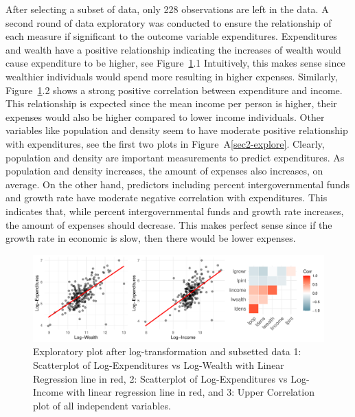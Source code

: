 \documentclass[11pt]{article}\usepackage[]{graphicx}\usepackage[]{color}
\makeatletter
\def\maxwidth{ %
  \ifdim\Gin@nat@width>\linewidth
    \linewidth
  \else
    \Gin@nat@width
  \fi
}
\makeatother
\begin{document}
\noindent After selecting a subset of data, only 228 observations are left in the data. A second round of data exploratory was conducted to ensure the relationship of each measure if significant to the outcome variable expenditures. Expenditures and wealth have a positive relationship indicating the increases of wealth would cause expenditure to be higher, see Figure~\ref{sec-explore}.1 Intuitively, this makes sense since wealthier individuals would spend more resulting in higher expenses. Similarly, Figure~\ref{sec-explore}.2 shows a strong positive correlation between expenditure and income. This relationship is expected since the mean income per person is higher, their expenses would also be higher compared to lower income individuals. Other variables like population and density seem to have moderate positive relationship with expenditures, see the first two plots in Figure~A\ref{sec2-explore}. Clearly, population and density are important measurements to predict expenditures. As population and density increases, the amount of expenses also increases, on average. On the other hand, predictors including percent intergovernmental funds and growth rate have moderate negative correlation with expenditures. This indicates that, while percent intergovernmental funds and growth rate increases, the amount of expenses should decrease. This makes perfect sense since if the growth rate in economic is slow, then there would be lower expenses.             

\begin{figure}[h!] 
\begin{center}

\includegraphics[width=\maxwidth]{figure/unnamed-chunk-3-1} 

\caption{Exploratory plot after log-transformation and subsetted data 1: Scatterplot of Log-Expenditures vs Log-Wealth with Linear Regression line in red, 2: Scatterplot of Log-Expenditures vs Log-Income with linear regression line in red, and 3: Upper Correlation plot of all independent variables.}
\label{sec-explore}
\end{center} 
\end{figure}
\end{document}
